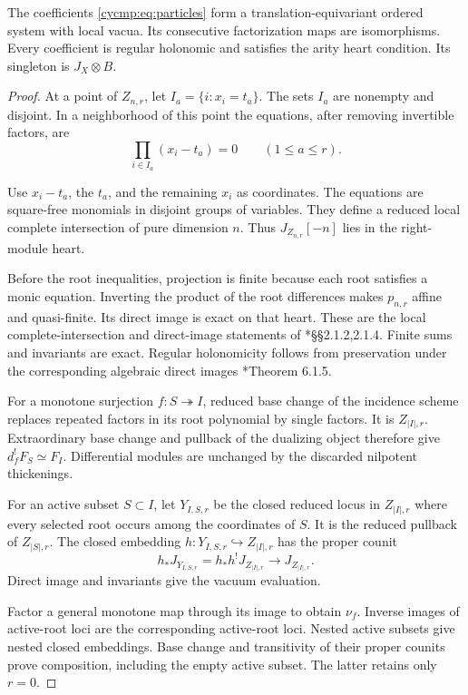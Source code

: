 \begin{theorem}\label{cycmp:thm:particles}
The coefficients \eqref{cycmp:eq:particles} form a translation-equivariant
ordered system with local vacua. Its consecutive factorization maps
are isomorphisms. Every coefficient is regular holonomic and satisfies
the arity heart condition. Its singleton is $J_X\otimes B$.
\end{theorem}

\begin{proof}
At a point of $Z_{n,r}$, let $I_a=\{i:x_i=t_a\}$. The sets $I_a$
are nonempty and disjoint. In a neighborhood of this point the
equations, after removing invertible factors, are
\[
 \prod_{i\in I_a}(x_i-t_a)=0\qquad(1\le a\le r).
\]

Use $x_i-t_a$, the $t_a$, and the remaining $x_i$ as coordinates.
The equations are square-free monomials in disjoint groups of
variables. They define a reduced local complete intersection of pure
dimension $n$. Thus $J_{Z_{n,r}}[-n]$ lies in the right-module heart.

Before the root inequalities, projection is finite because each root
satisfies a monic equation. Inverting the product of the root
differences makes $p_{n,r}$ affine and quasi-finite. Its direct image
is exact on that heart. These are the local complete-intersection and
direct-image statements of \cite{BD04}*{\S\S2.1.2,2.1.4}.
Finite sums and invariants are exact. Regular holonomicity follows
from preservation under the corresponding algebraic direct images
\cite{cycmp:HTT}*{Theorem 6.1.5}.

For a monotone surjection $f:S\twoheadrightarrow I$, reduced base
change of the incidence scheme replaces repeated factors in its
root polynomial by single factors. It is $Z_{|I|,r}$. Extraordinary
base change and pullback of the dualizing object therefore give
$d_f^!F_S\simeq F_I$. Differential modules are unchanged by the
discarded nilpotent thickenings.

For an active subset $S\subset I$, let $Y_{I,S,r}$ be the closed
reduced locus in $Z_{|I|,r}$ where every selected root occurs among
the coordinates of $S$. It is the reduced pullback of $Z_{|S|,r}$.
The closed embedding $h:Y_{I,S,r}\hookrightarrow Z_{|I|,r}$ has the
proper counit
\[
 h_*J_{Y_{I,S,r}}=h_*h^!J_{Z_{|I|,r}}\longrightarrow J_{Z_{|I|,r}}.
\]
Direct image and invariants give the vacuum evaluation.

Factor a
general monotone map through its image to obtain $\nu_f$. Inverse
images of active-root loci are the corresponding active-root loci.
Nested active subsets give nested closed embeddings. Base change
and transitivity of their proper counits prove composition, including
the empty active subset. The latter retains only $r=0$.


\end{proof}
